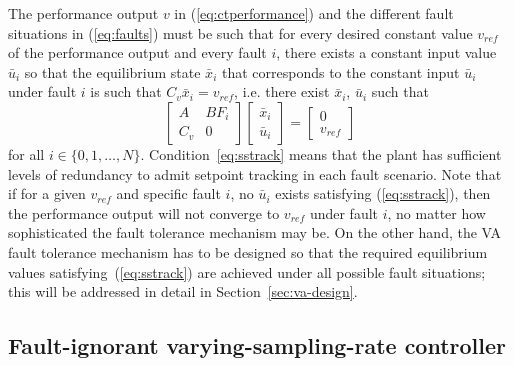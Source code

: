\documentclass[letterpaper, 10 pt, conference]{ieeeconf}
\newcommand{\C}{\mathbb{C}}
\begin{document}
The performance output $v$ in (\ref{eq:ctperformance}) and the
different fault situations in (\ref{eq:faults}) must be such that for
every desired constant value $v_{ref}$ of the performance output and
every fault $i$, there exists a constant input value $\bar u_i$ so
that the equilibrium state $\bar x_i$ that corresponds to the constant
input $\bar u_i$ under fault $i$ is such that $C_v \bar x_i =
v_{ref}$, i.e. there exist $ \bar x_i$, $\bar u_i$ such that
\begin{equation}
  \label{eq:sstrack}
  \begin{bmatrix}
    A & B F_i \\C_v & 0
  \end{bmatrix}
  \begin{bmatrix}
     \bar x_i  \\\bar u_i
  \end{bmatrix} =
  \begin{bmatrix}
    0\\ v_{ref}
  \end{bmatrix}
\end{equation}
for all $i\in\{0,1,\ldots,N\}$. Condition~\eqref{eq:sstrack} means
that the plant has sufficient levels of redundancy to admit setpoint
tracking in each fault scenario. 
Note that if for a given $v_{ref}$ and specific fault $i$, no $\bar
u_i$ exists satisfying (\ref{eq:sstrack}), then the performance output
will not converge to $v_{ref}$ under fault $i$, no matter how
sophisticated the fault tolerance mechanism may be. On the other hand,
the VA fault tolerance mechanism has to be designed so that the
required equilibrium values satisfying~(\ref{eq:sstrack}) are achieved
under all possible fault situations; this will be addressed in detail
in Section~\ref{sec:va-design}.



\subsection{Fault-ignorant varying-sampling-rate controller}
\label{sec:fault-ign-contr}
\end{document}
